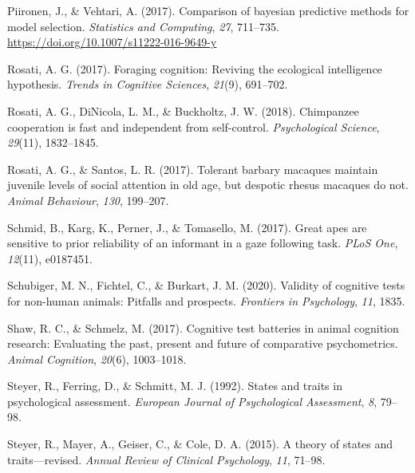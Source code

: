 \documentclass[
  man,floatsintext]{apa6}
\newlength{\cslhangindent}
\newlength{\cslentryspacingunit} %
\newenvironment{CSLReferences}[2] %
 {%
  \setlength{\parindent}{0pt}
  \ifodd #1
  \let\oldpar\par
  \def\par{\hangindent=\cslhangindent\oldpar}
  \fi
  \setlength{\parskip}{#2\cslentryspacingunit}
 }%
 {}
\begin{document}
\begin{CSLReferences}{1}{0}
\leavevmode{}%
Piironen, J., \& Vehtari, A. (2017). Comparison of bayesian predictive methods for model selection. \emph{Statistics and Computing}, \emph{27}, 711--735. \url{https://doi.org/10.1007/s11222-016-9649-y}

\leavevmode{}%
Rosati, A. G. (2017). Foraging cognition: Reviving the ecological intelligence hypothesis. \emph{Trends in Cognitive Sciences}, \emph{21}(9), 691--702.

\leavevmode{}%
Rosati, A. G., DiNicola, L. M., \& Buckholtz, J. W. (2018). Chimpanzee cooperation is fast and independent from self-control. \emph{Psychological Science}, \emph{29}(11), 1832--1845.

\leavevmode{}%
Rosati, A. G., \& Santos, L. R. (2017). Tolerant barbary macaques maintain juvenile levels of social attention in old age, but despotic rhesus macaques do not. \emph{Animal Behaviour}, \emph{130}, 199--207.

\leavevmode{}%
Schmid, B., Karg, K., Perner, J., \& Tomasello, M. (2017). Great apes are sensitive to prior reliability of an informant in a gaze following task. \emph{PLoS One}, \emph{12}(11), e0187451.

\leavevmode{}%
Schubiger, M. N., Fichtel, C., \& Burkart, J. M. (2020). Validity of cognitive tests for non-human animals: Pitfalls and prospects. \emph{Frontiers in Psychology}, \emph{11}, 1835.

\leavevmode{}%
Shaw, R. C., \& Schmelz, M. (2017). Cognitive test batteries in animal cognition research: Evaluating the past, present and future of comparative psychometrics. \emph{Animal Cognition}, \emph{20}(6), 1003--1018.

\leavevmode{}%
Steyer, R., Ferring, D., \& Schmitt, M. J. (1992). States and traits in psychological assessment. \emph{European Journal of Psychological Assessment}, \emph{8}, 79--98.

\leavevmode{}%
Steyer, R., Mayer, A., Geiser, C., \& Cole, D. A. (2015). A theory of states and traits---revised. \emph{Annual Review of Clinical Psychology}, \emph{11}, 71--98.


\end{CSLReferences}
\end{document}
